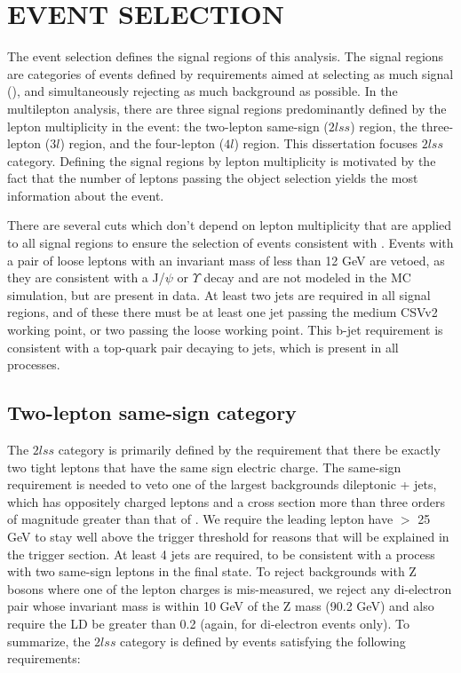 %
%

\chapter{EVENT SELECTION}
\label{chap:event_selection}
The event selection defines the signal regions of this analysis. The signal regions are categories of events defined by requirements aimed at 
selecting as much signal (\tth), and simultaneously rejecting as much background as possible.
In the multilepton analysis, there are three signal regions predominantly defined by the lepton multiplicity in the event: the two-lepton same-sign ($2lss$) region,
the three-lepton ($3l$) region, and the four-lepton ($4l$) region. This dissertation focuses $2lss$ category. Defining the signal regions by lepton multiplicity is motivated
by the fact that the number of leptons passing the object selection yields the most information about the event.

There are several cuts which don't depend on lepton multiplicity that are applied to all signal regions to ensure the selection of events consistent with \tth. Events with
a pair of loose leptons with an invariant mass of less than 12 GeV are vetoed, as they are consistent with a J/$\psi$ or $\Upsilon$ decay and are not modeled in the MC
simulation, but are present in data. At least two jets are required in all signal regions, and of these there must be at least one jet passing the medium CSVv2 working point,
or two passing the loose working point. This b-jet requirement is consistent with a top-quark pair decaying to jets, which is present in all \tth processes. 

\section{Two-lepton same-sign category}
The $2lss$ category is primarily defined by the requirement that there be exactly two tight leptons that have the same sign electric charge. The same-sign requirement is needed to veto 
one of the largest backgrounds dileptonic \ttbar + jets, which has oppositely charged leptons and a cross section more than three orders of magnitude greater than that of \tth. We require
the leading lepton have \pt $>$ 25 GeV to stay well above the trigger threshold for reasons that will be explained in the trigger section. At least 4 jets are required, to be consistent with
a \tth process with two same-sign leptons in the final state. To reject backgrounds with Z bosons where one of the lepton charges is mis-measured, we reject any di-electron pair whose invariant
mass is within 10 GeV of the Z mass (90.2 GeV) and also require the \met LD be greater than 0.2 (again, for di-electron events only). To summarize, the $2lss$ category is defined by events
satisfying the following requirements:

